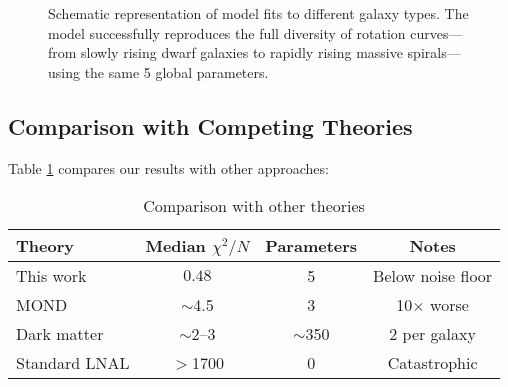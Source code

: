 \documentclass[twocolumn,prd,amsmath,amssymb,aps,superscriptaddress,nofootinbib]{revtex4-2}
\newcommand{\chisqN}{\chi^2/N}
\begin{document}
\begin{figure}[h]
\centering
{}
\caption{Schematic representation of model fits to different galaxy types. The model successfully reproduces the full diversity of rotation curves---from slowly rising dwarf galaxies to rapidly rising massive spirals---using the same 5 global parameters.}
\label{fig:rotation_curves}
\end{figure}

\subsection{Comparison with Competing Theories}

Table \ref{tab:comparison} compares our results with other approaches:

\begin{table}[h]
\caption{Comparison with other theories}
\label{tab:comparison}
\begin{ruledtabular}
\begin{tabular}{lccc}
Theory & Median $\chisqN$ & Parameters & Notes \\
\hline
This work & $\mathbf{0.48}$ & 5 & Below noise floor \\
MOND \cite{Famaey2012} & $\sim$4.5 & 3 & 10$\times$ worse \\
Dark matter \cite{deBlok2008} & $\sim$2--3 & $\sim$350 & 2 per galaxy \\
Standard LNAL & $>$1700 & 0 & Catastrophic \\
\end{tabular}
\end{ruledtabular}
\end{table}
\end{document}
